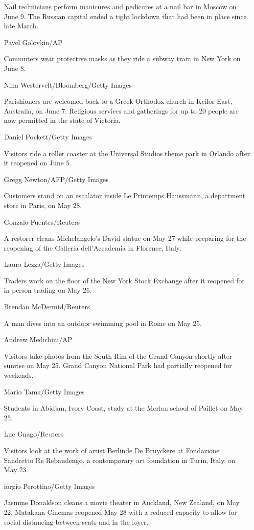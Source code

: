 Nail technicians perform manicures and pedicures at a nail bar in Moscow
on June 9. The Russian capital ended a tight lockdown that had been in
place since late March.

Pavel Golovkin/AP

Commuters wear protective masks as they ride a subway train in New York
on June 8.

Nina Westervelt/Bloomberg/Getty Images

Parishioners are welcomed back to a Greek Orthodox church in Keilor
East, Australia, on June 7. Religious services and gatherings for up to
20 people are now permitted in the state of Victoria.

Daniel Pockett/Getty Images

Visitors ride a roller coaster at the Universal Studios theme park in
Orlando after it reopened on June 5.

Gregg Newton/AFP/Getty Images

Customers stand on an escalator inside Le Printemps Haussmann, a
department store in Paris, on May 28.

Gonzalo Fuentes/Reuters

A restorer cleans Michelangelo's David statue on May 27 while preparing
for the reopening of the Galleria dell'Accademia in Florence, Italy.

Laura Lezza/Getty Images

Traders work on the floor of the New York Stock Exchange after it
reopened for in-person trading on May 26.

Brendan McDermid/Reuters

A man dives into an outdoor swimming pool in Rome on May 25.

Andrew Medichini/AP

Visitors take photos from the South Rim of the Grand Canyon shortly
after sunrise on May 25. Grand Canyon National Park had partially
reopened for weekends.

Mario Tama/Getty Images

Students in Abidjan, Ivory Coast, study at the Merlan school of Paillet
on May 25.

Luc Gnago/Reuters

Visitors look at the work of artist Berlinde De Bruyckere at Fondazione
Sandretto Re Rebaudengo, a contemporary art foundation in Turin, Italy,
on May 23.

iorgio Perottino/Getty Images

Jasmine Donaldson cleans a movie theater in Auckland, New Zealand, on
May 22. Matakana Cinemas reopened May 28 with a reduced capacity to
allow for social distancing between seats and in the foyer.

